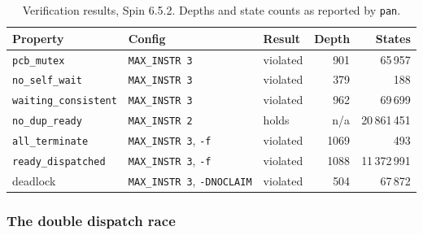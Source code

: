 \documentclass[11pt,a4paper]{article}
\newcommand{\code}[1]{\texttt{#1}}
\begin{document}
\begin{table}[htbp]
\centering
\caption{Verification results, Spin 6.5.2. Depths and state counts as
reported by \code{pan}.}
\label{tab:results}
\begin{tabular}{l l l r r}
\toprule
\textbf{Property} & \textbf{Config} & \textbf{Result} & \textbf{Depth} & \textbf{States} \\
\midrule
\code{pcb\_mutex}          & \code{MAX\_INSTR 3} & violated & 901  & 65\,957 \\
\code{no\_self\_wait}      & \code{MAX\_INSTR 3} & violated & 379  & 188 \\
\code{waiting\_consistent} & \code{MAX\_INSTR 3} & violated & 962  & 69\,699 \\
\code{no\_dup\_ready}      & \code{MAX\_INSTR 2} & holds    & n/a  & 20\,861\,451 \\
\code{all\_terminate}      & \code{MAX\_INSTR 3}, \code{-f} & violated & 1069 & 493 \\
\code{ready\_dispatched}   & \code{MAX\_INSTR 3}, \code{-f} & violated & 1088 & 11\,372\,991 \\
deadlock                   & \code{MAX\_INSTR 3}, \code{-DNOCLAIM} & violated & 504 & 67\,872 \\
\bottomrule
\end{tabular}
\end{table}

\subsubsection*{The double dispatch race}

\end{document}
